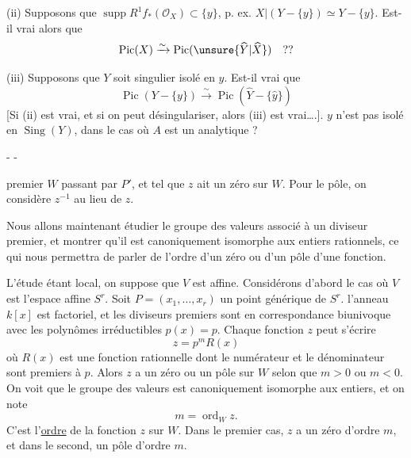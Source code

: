(ii) Supposons que $\operatorname{supp}R^1f_*(\mathcal O_X)\subset\{y\}$,  p. ex. $X|(Y-\{y\})\simeq Y-\{y\}$. Est-il vrai alors que
\[
\operatorname{Pic}(X)\xrightarrow{\sim}\operatorname{Pic}(\unsure{\widehat Y|\widehat X})\quad ??
\]

(iii) Supposons que $Y$ soit  singulier isolé en $y$. Est-il vrai que
\[
\operatorname{Pic}(Y-\{y\})\xrightarrow{\sim}\operatorname{Pic}(\widehat Y-\{\widehat y\})
\]
[Si (ii) est vrai, et si on peut désingulariser, alors (iii) est vrai\ldots.].  $y$ n'est pas isolé en $\operatorname{Sing}(Y)$, dans le cas où $A$ est un  analytique ?

-  -

premier $W$ passant par $P'$, et tel que $z$ ait un zéro sur $W$. Pour le pôle, on considère $z^{-1}$ au lieu de $z$.

Nous allons maintenant étudier le groupe des valeurs associé à un diviseur premier, et montrer qu'il est canoniquement isomorphe aux entiers rationnels, ce qui nous permettra de parler de l'ordre d'un zéro ou d'un pôle d'une fonction.

L'étude étant local, on suppose que $V$ est affine. Considérons d'abord le cas où $V$ est l'espace affine $S^r$. Soit $P=(x_1,\ldots,x_r)$ un point générique de $S^r$. l'anneau $k[x]$ est factoriel, et les diviseurs premiers sont en correspondance biunivoque avec les polynômes irréductibles $p(x)=p$. Chaque fonction $z$ peut s'écrire
\[
z=p^mR(x)
\]
où $R(x)$ est une fonction rationnelle dont le numérateur et le dénominateur sont premiers à $p$. Alors $z$ a un zéro ou un pôle sur $W$ selon que $m>0$ ou $m<0$. On voit que le groupe des valeurs est canoniquement isomorphe aux entiers, et on note
\[
m=\operatorname{ord}_W z.
\]
C'est l'\uline{ordre} de la fonction $z$ sur $W$. Dans le premier cas, $z$ a un zéro d'ordre $m$, et dans le second, un pôle d'ordre $m$.


